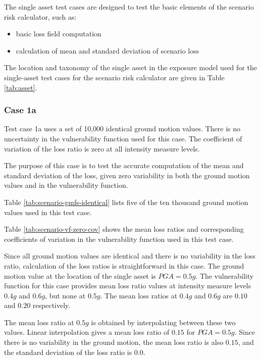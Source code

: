 The single asset test cases are designed to test the basic elements of the scenario risk calculator, such as:

\begin{itemize}
\item basic loss field computation
\item calculation of mean and standard deviation of scenario loss
\end{itemize}



The location and taxonomy of the single asset in the exposure model used for the single-asset test cases for the scenario risk calculator are given in Table \ref{tab:asset}.

\subsubsection{Case 1a}
Test case 1a uses a set of 10,000 identical ground motion values. There is no uncertainty in the vulnerability function used for this case. The coefficient of variation of the loss ratio is zero at all intensity measure levels.

The purpose of this case is to test the accurate computation of the mean and standard deviation of the loss, given zero variability in both the ground motion values and in the vulnerability function.



Table \ref{tab:scenario-gmfs-identical} lists five of the ten thousand ground motion values used in this test case.



Table \ref{tab:scenario-vf-zero-cov} shows the mean loss ratios and corresponding coefficients of variation in the vulnerability function used in this test case.

Since all ground motion values are identical and there is no variability in the loss ratio, calculation of the loss ratios is straightforward in this case. The ground motion value at the location of the single asset is $PGA = 0.5 g$. The vulnerability function for this case provides mean loss ratio values at intensity measure levels $0.4 g$ and $0.6 g$, but none at $0.5 g$. The mean loss ratios at $0.4 g$ and $0.6 g$ are $0.10$ and $0.20$ respectively.

The mean loss ratio at $0.5 g$ is obtained by interpolating between these two values. Linear interpolation gives a mean loss ratio of $0.15$ for $PGA = 0.5 g$. Since there is no variability in the ground motion, the mean loss ratio is also $0.15$, and the standard deviation of the loss ratio is $0.0$.

